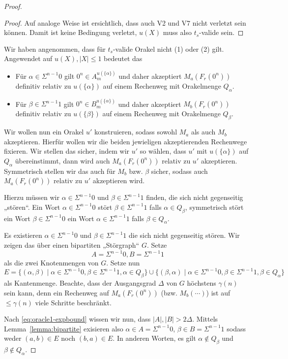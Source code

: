 \begin{proof}
\begin{proof}
    Auf analoge Weise ist ersichtlich, dass auch V2 und V7 nicht verletzt sein können.
    Damit ist keine Bedingung verletzt, $u(X)$ muss also $t_s$-valide sein.
\end{proof}

Wir haben angenommen, dass für $t_{s}$-valide Orakel nicht (1) oder (2) gilt. Angewendet auf $u(X), |X|\leq 1$ bedeutet das
\begin{itemize}[nosep]
    \item Für $\alpha\in \Sigma^{n-1}0$ gilt $0^n\in A_m^{u(\{\alpha\})}$ und daher akzeptiert $M_a(F_r(0^n))$ definitiv relativ zu $u(\{\alpha\})$ auf einem Rechenweg mit Orakelmenge $Q_\alpha$.
    \item Für $\beta\in \Sigma^{n-1}1$ gilt $0^n\in B_m^{u(\{\alpha\})}$ und daher akzeptiert $M_b(F_r(0^n))$ definitiv relativ zu $u(\{\beta\})$ auf einem Rechenweg mit Orakelmenge $Q_\beta$.
\end{itemize}
Wir wollen nun ein Orakel $u'$ konstruieren, sodass sowohl $M_a$ als auch $M_b$ akzeptieren.
Hierfür wollen wir die beiden jewieligen akzeptierenden Rechenwege fixieren.
Wir stellen das sicher, indem wir $u'$ so wählen, dass $u'$ mit $u(\{\alpha\})$ auf $Q_\alpha$ übereinstimmt, dann wird auch $M_a(F_r(0^n))$ relativ zu $u'$ akzeptieren.
Symmetrisch stellen wir das auch für $M_b$ bzw. $\beta$ sicher, sodass auch $M_a(F_r(0^n))$ relativ zu $u'$ akzeptieren wird.

Hierzu müssen wir $\alpha\in\Sigma^{n-1}0$ und $\beta\in\Sigma^{n-1}1$ finden, die sich nicht gegenseitig „stören“.
Ein Wort $\alpha\in\Sigma^{n-1}0$ stört $\beta\in\Sigma^{n-1}1$ falls $\alpha\in Q_\beta$, 
symmetrisch stört ein Wort $\beta\in\Sigma^{n-1}0$ ein Wort  $\alpha\in\Sigma^{n-1}1$ falls $\beta\in Q_\alpha$.

Es existieren $\alpha\in\Sigma^{n-1}0$ und $\beta\in\Sigma^{n-1}1$ die sich nicht gegenseitig stören. Wir zeigen das über einen bipartiten „Störgraph“ $G$.
Setze 
\[ A=\Sigma^{n-1}0, B=\Sigma^{n-1}1 \]
als die zwei Knotenmengen von $G$.
Setze nun
\[ E = \{ (\alpha, \beta) \mid \alpha\in\Sigma^{n-1}0, \beta\in\Sigma^{n-1}1, \alpha\in Q_\beta\} \cup \{ (\beta, \alpha) \mid \alpha\in\Sigma^{n-1}0, \beta\in\Sigma^{n-1}1, \beta\in Q_\alpha\} \]
als Kantenmenge.
Beachte, dass der Ausgangsgrad $\Delta$ von $G$ höchstens $\gamma(n)$ sein kann, denn ein Rechenweg auf $M_a(F_r(0^n))$ (bzw. $M_b(\cdots)$) ist auf $\leq \gamma(n)$ viele Schritte beschränkt.

Nach \eqref{eq:oracle1-expbound} wissen wir nun, dass $|A|, |B|>2\Delta$. Mittels Lemma~\ref{lemma:bipartite} exisieren also $\alpha\in A = \Sigma^{n-1}0$, $\beta\in B=\Sigma^{n-1}1$ sodass weder $(a,b)\in E$ noch $(b,a)\in E$.
In anderen Worten, es gilt $\alpha\not\in Q_\beta$ und $\beta\not\in Q_\alpha$.


\end{proof}
